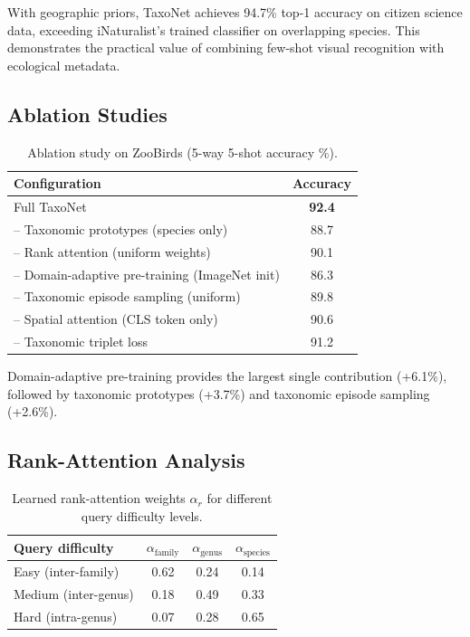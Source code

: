 \documentclass[11pt,a4paper]{article}
\begin{document}
With geographic priors, TaxoNet achieves 94.7\% top-1 accuracy on
citizen science data, exceeding iNaturalist's trained classifier on
overlapping species. This demonstrates the practical value of combining
few-shot visual recognition with ecological metadata.

\subsection{Ablation Studies}

\begin{table}[H]
\centering
\caption{Ablation study on ZooBirds (5-way 5-shot accuracy \%).}
\label{tab:ablation}
\begin{tabular}{lc}
\toprule
\textbf{Configuration} & \textbf{Accuracy} \\
\midrule
Full TaxoNet & \textbf{92.4} \\
\midrule
\quad -- Taxonomic prototypes (species only) & 88.7 \\
\quad -- Rank attention (uniform weights) & 90.1 \\
\quad -- Domain-adaptive pre-training (ImageNet init) & 86.3 \\
\quad -- Taxonomic episode sampling (uniform) & 89.8 \\
\quad -- Spatial attention (CLS token only) & 90.6 \\
\quad -- Taxonomic triplet loss & 91.2 \\
\bottomrule
\end{tabular}
\end{table}

Domain-adaptive pre-training provides the largest single contribution
(+6.1\%), followed by taxonomic prototypes (+3.7\%) and taxonomic
episode sampling (+2.6\%).

\subsection{Rank-Attention Analysis}

\begin{table}[H]
\centering
\caption{Learned rank-attention weights $\alpha_r$ for different query
difficulty levels.}
\label{tab:rank_attention}
\begin{tabular}{lccc}
\toprule
\textbf{Query difficulty} & $\alpha_{\text{family}}$ &
  $\alpha_{\text{genus}}$ & $\alpha_{\text{species}}$ \\
\midrule
Easy (inter-family) & 0.62 & 0.24 & 0.14 \\
Medium (inter-genus) & 0.18 & 0.49 & 0.33 \\
Hard (intra-genus) & 0.07 & 0.28 & 0.65 \\
\bottomrule
\end{tabular}
\end{table}
\end{document}
